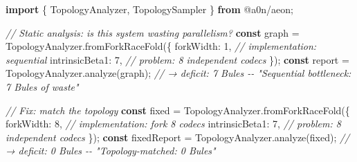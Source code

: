 \documentclass[
  11pt,
]{article}
\newenvironment{Shaded}{}{}
\newcommand{\CommentTok}[1]{\textcolor[rgb]{0.38,0.63,0.69}{\textit{#1}}}
\newcommand{\DecValTok}[1]{\textcolor[rgb]{0.25,0.63,0.44}{#1}}
\newcommand{\FunctionTok}[1]{\textcolor[rgb]{0.02,0.16,0.49}{#1}}
\newcommand{\ImportTok}[1]{\textcolor[rgb]{0.00,0.50,0.00}{\textbf{#1}}}
\newcommand{\KeywordTok}[1]{\textcolor[rgb]{0.00,0.44,0.13}{\textbf{#1}}}
\newcommand{\NormalTok}[1]{#1}
\newcommand{\OperatorTok}[1]{\textcolor[rgb]{0.40,0.40,0.40}{#1}}
\newcommand{\StringTok}[1]{\textcolor[rgb]{0.25,0.44,0.63}{#1}}
\begin{document}
\begin{Shaded}
\begin{Highlighting}[]
\ImportTok{import}\NormalTok{ \{ TopologyAnalyzer}\OperatorTok{,}\NormalTok{ TopologySampler \} }\ImportTok{from} \StringTok{\textquotesingle{}@a0n/aeon\textquotesingle{}}\OperatorTok{;}

\CommentTok{// Static analysis: is this system wasting parallelism?}
\KeywordTok{const}\NormalTok{ graph }\OperatorTok{=}\NormalTok{ TopologyAnalyzer}\OperatorTok{.}\FunctionTok{fromForkRaceFold}\NormalTok{(\{}
\NormalTok{  forkWidth}\OperatorTok{:} \DecValTok{1}\OperatorTok{,}        \CommentTok{// implementation: sequential}
\NormalTok{  intrinsicBeta1}\OperatorTok{:} \DecValTok{7}\OperatorTok{,}   \CommentTok{// problem: 8 independent codecs}
\NormalTok{\})}\OperatorTok{;}
\KeywordTok{const}\NormalTok{ report }\OperatorTok{=}\NormalTok{ TopologyAnalyzer}\OperatorTok{.}\FunctionTok{analyze}\NormalTok{(graph)}\OperatorTok{;}
\CommentTok{// → deficit: 7 Bules {-}{-} "Sequential bottleneck: 7 Bules of waste"}

\CommentTok{// Fix: match the topology}
\KeywordTok{const}\NormalTok{ fixed }\OperatorTok{=}\NormalTok{ TopologyAnalyzer}\OperatorTok{.}\FunctionTok{fromForkRaceFold}\NormalTok{(\{}
\NormalTok{  forkWidth}\OperatorTok{:} \DecValTok{8}\OperatorTok{,}        \CommentTok{// implementation: fork 8 codecs}
\NormalTok{  intrinsicBeta1}\OperatorTok{:} \DecValTok{7}\OperatorTok{,}   \CommentTok{// problem: 8 independent codecs}
\NormalTok{\})}\OperatorTok{;}
\KeywordTok{const}\NormalTok{ fixedReport }\OperatorTok{=}\NormalTok{ TopologyAnalyzer}\OperatorTok{.}\FunctionTok{analyze}\NormalTok{(fixed)}\OperatorTok{;}
\CommentTok{// → deficit: 0 Bules {-}{-} "Topology{-}matched: 0 Bules"}


\end{Highlighting}
\end{Shaded}
\end{document}
